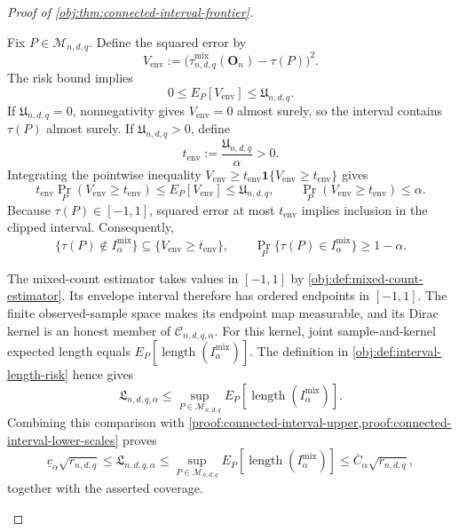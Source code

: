 \documentclass[11pt]{article}
\begin{document}
\begin{proof}[Proof of \cref{obj:thm:connected-interval-frontier}]
\begin{enumerate}
Fix \(P\in\mathcal M_{n,d,q}\). Define the squared error by
\[
V_{\mathrm{env}}
:=
\bigl(\widehat\tau^{\mathrm{mix}}_{n,d,q}(\mathbf O_n)-\tau(P)\bigr)^2.
\]
The risk bound implies
\[
0\le E_P[V_{\mathrm{env}}]\le\mathfrak U_{n,d,q}.
\]
If \(\mathfrak U_{n,d,q}=0\), nonnegativity gives
\(V_{\mathrm{env}}=0\) almost surely, so the interval contains
\(\tau(P)\) almost surely. If \(\mathfrak U_{n,d,q}>0\), define
\[
t_{\mathrm{env}}:=\frac{\mathfrak U_{n,d,q}}{\alpha}>0.
\]
Integrating the pointwise inequality
\(V_{\mathrm{env}}\ge
t_{\mathrm{env}}\mathbf1\{V_{\mathrm{env}}\ge t_{\mathrm{env}}\}\)
gives
\[
t_{\mathrm{env}}\Pr_P(V_{\mathrm{env}}\ge t_{\mathrm{env}})
\le E_P[V_{\mathrm{env}}]\le\mathfrak U_{n,d,q},
\qquad
\Pr_P(V_{\mathrm{env}}\ge t_{\mathrm{env}})\le\alpha.
\]
Because \(\tau(P)\in[-1,1]\), squared error at most
\(t_{\mathrm{env}}\) implies inclusion in the clipped interval.
Consequently,
\[
\{\tau(P)\notin I^{\mathrm{mix}}_\alpha\}
\subseteq\{V_{\mathrm{env}}\ge t_{\mathrm{env}}\},
\qquad
\Pr_P\{\tau(P)\in I^{\mathrm{mix}}_\alpha\}\ge1-\alpha.
\]

The mixed-count estimator takes values in \([-1,1]\) by
\cref{obj:def:mixed-count-estimator}. Its envelope interval therefore
has ordered endpoints in \([-1,1]\). The finite observed-sample space
makes its endpoint map measurable, and its Dirac kernel is an honest
member of \(\mathcal C_{n,d,q,\alpha}\). For this kernel, joint
sample-and-kernel expected length equals
\(E_P[\operatorname{length}(I^{\mathrm{mix}}_\alpha)]\).
The definition in \cref{obj:def:interval-length-risk} hence gives
\[
\mathfrak L_{n,d,q,\alpha}
\le
\sup_{P\in\mathcal M_{n,d,q}}
E_P[\operatorname{length}(I^{\mathrm{mix}}_\alpha)].
\]
Combining this comparison with \cref{proof:connected-interval-upper,proof:connected-interval-lower-scales} proves
\[
\underline c_\alpha\sqrt{r_{n,d,q}}
\le\mathfrak L_{n,d,q,\alpha}
\le
\sup_{P\in\mathcal M_{n,d,q}}
E_P[\operatorname{length}(I^{\mathrm{mix}}_\alpha)]
\le\overline C_\alpha\sqrt{r_{n,d,q}},
\]
together with the asserted coverage.
\end{enumerate}
\end{proof}
\end{document}
